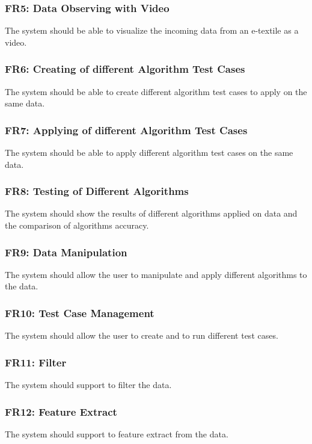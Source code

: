 \subsubsection{FR5: Data Observing with Video}
The system should be able to visualize the incoming data from an e-textile as a video.

\subsubsection{FR6: Creating of different Algorithm Test Cases}
The system should be able to create different algorithm test cases to apply on the same data.

\subsubsection{FR7: Applying of different Algorithm Test Cases}
The system should be able to apply different algorithm test cases on the same data.

\subsubsection{FR8: Testing of Different Algorithms}
The system should show the results of different algorithms applied on data and the comparison of algorithms accuracy. 

\subsubsection{FR9: Data Manipulation}
The system should allow the user to manipulate and apply different algorithms to the data.

\subsubsection{FR10: Test Case Management}
The system should allow the user to create and to run different test cases.

\subsubsection{FR11: Filter}
The system should support to filter the data.

\subsubsection{FR12: Feature Extract}
The system should support to feature extract from the data.


